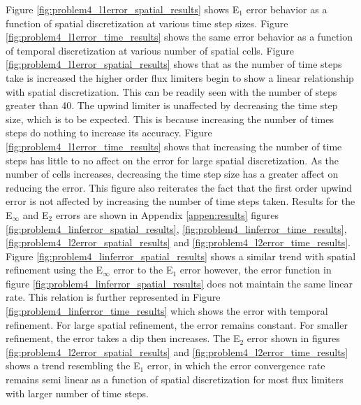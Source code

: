 Figure \ref{fig:problem4_l1error_spatial_results} shows E${}_{1}$ error behavior as a function of spatial discretization at various time step sizes. Figure \ref{fig:problem4_l1error_time_results} shows the same error behavior as a function of temporal discretization at various number of spatial cells. Figure \ref{fig:problem4_l1error_spatial_results} shows that as the number of time steps take is increased the higher order flux limiters begin to show a linear relationship with spatial discretization. This can be readily seen with the number of steps greater than 40. The upwind limiter is unaffected by decreasing the time step size, which is to be expected. This is because increasing the number of times steps do nothing to increase its accuracy. Figure \ref{fig:problem4_l1error_time_results} shows that increasing the number of time steps has little to no affect on the error for large spatial discretization. As the number of cells increases, decreasing the time step size has a greater affect on reducing the error. This figure also reiterates the fact that the first order upwind error is not affected by increasing the number of time steps taken. Results for the E${}_{\infty}$ and E${}_{2}$ errors are shown in Appendix \ref{appen:results} figures \ref{fig:problem4_linferror_spatial_results}, \ref{fig:problem4_linferror_time_results}, \ref{fig:problem4_l2error_spatial_results} and \ref{fig:problem4_l2error_time_results}. Figure \ref{fig:problem4_linferror_spatial_results} shows a similar trend with spatial refinement using the E${}_{\infty}$ error to the E${}_{1}$ error however, the error function in figure \ref{fig:problem4_linferror_spatial_results} does not maintain the same linear rate. This relation is further represented in Figure \ref{fig:problem4_linferror_time_results} which shows the error with temporal refinement. For large spatial refinement, the error remains constant. For smaller refinement, the error takes a dip then increases. The E${}_{2}$ error shown in figures \ref{fig:problem4_l2error_spatial_results} and \ref{fig:problem4_l2error_time_results} shows a trend resembling the E${}_{1}$ error, in which the error convergence rate remains semi linear as a function of spatial discretization for most flux limiters with larger number of time steps. 

